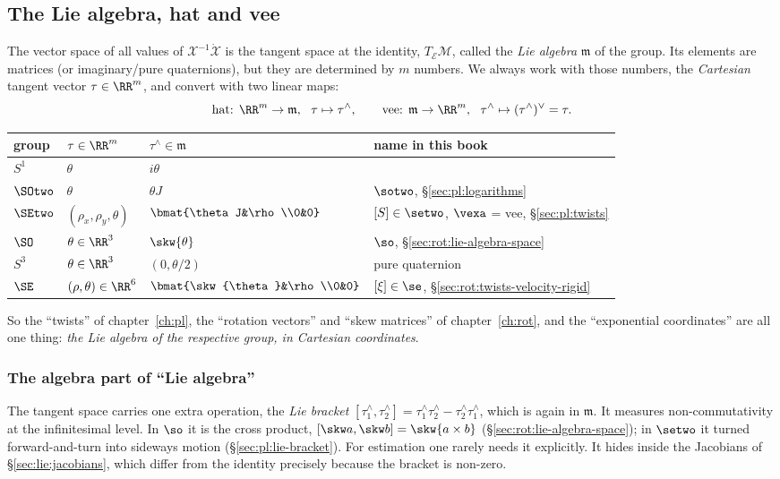 \subsection{The Lie algebra, hat and vee}\label{sec:lie:hat-vee}

The vector space of all values of $\mathcal X^{-1}\dot{\mathcal X}$ is the tangent space at the identity, $T_{\mathcal E}\mathcal M$, called the \emph{Lie algebra} $\mathfrak m$ of the group. Its elements are matrices (or imaginary/pure quaternions), but they are determined by $m$ numbers. We always work with those numbers, the \emph{Cartesian} tangent vector $\tau\in\RR^m$, and convert with two linear maps:
\[
\text{hat: }\RR^m\to\mathfrak m,\ \ \tau\mapsto\tau^\wedge,\qquad\text{vee: }\mathfrak m\to\RR^m,\ \ \tau^\wedge\mapsto(\tau^\wedge)^\vee=\tau .
\]
\begin{center}\small
\renewcommand{\arraystretch}{1.2}
\begin{tabular}{@{}llll@{}}\toprule
group & $\tau\in\RR^m$ & $\tau^\wedge\in\mathfrak m$ & name in this book\\\midrule
$S^1$ & $\theta$ & $i\theta$ & \\
$\SOtwo$ & $\theta$ & $\theta J$ & $\sotwo$, \S\ref{sec:pl:logarithms}\\
$\SEtwo$ & $(\rho_x,\rho_y,\theta)$ & $\bmat{\theta J&\rho\\0&0}$ & $[S]\in\setwo$, $\vexa$ = vee, \S\ref{sec:pl:twists}\\
$\SO$ & $\theta\in\RR^3$ & $\skw{\theta}$ & $\so$, \S\ref{sec:rot:lie-algebra-space}\\
$S^3$ & $\theta\in\RR^3$ & $(0,\theta/2)$ & pure quaternion\\
$\SE$ & $(\rho,\theta)\in\RR^6$ & $\bmat{\skw{\theta}&\rho\\0&0}$ & $[\xi]\in\se$, \S\ref{sec:rot:twists-velocity-rigid}\\\bottomrule
\end{tabular}
\end{center}
So the ``twists'' of chapter~\ref{ch:pl}, the ``rotation vectors'' and ``skew matrices'' of chapter~\ref{ch:rot}, and the ``exponential coordinates'' are all one thing: \emph{the Lie algebra of the respective group, in Cartesian coordinates}.

\subsubsection{The algebra part of ``Lie algebra''}
The tangent space carries one extra operation, the \emph{Lie bracket} $[\tau_1^\wedge,\tau_2^\wedge]=\tau_1^\wedge\tau_2^\wedge-\tau_2^\wedge\tau_1^\wedge$, which is again in $\mathfrak m$. It measures non-commutativity at the infinitesimal level. In $\so$ it is the cross product, $[\skw a,\skw b]=\skw{a\times b}$ (\S\ref{sec:rot:lie-algebra-space}); in $\setwo$ it turned forward-and-turn into sideways motion (\S\ref{sec:pl:lie-bracket}). For estimation one rarely needs it explicitly. It hides inside the Jacobians of \S\ref{sec:lie:jacobians}, which differ from the identity precisely because the bracket is non-zero.
